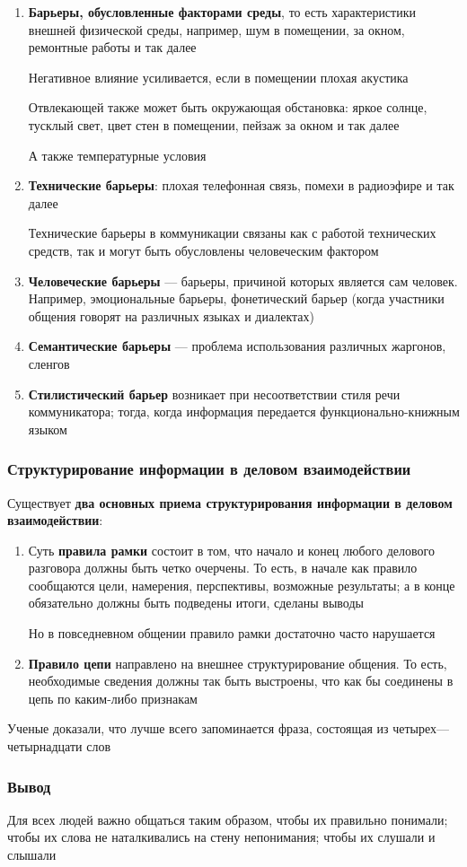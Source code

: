 \documentclass{article}
\begin{document}
\begin{enumerate}
    \item \textbf{Барьеры, обусловленные факторами среды}, то есть характеристики внешней физической среды, например, шум в помещении, за окном, ремонтные работы и так далее

    Негативное влияние усиливается, если в помещении плохая акустика

    Отвлекающей также может быть окружающая обстановка: яркое солнце, тусклый свет, цвет стен в помещении, пейзаж за окном и так далее

    А также температурные условия
    \item \textbf{Технические барьеры}: плохая телефонная связь, помехи в радиоэфире и так далее

    Технические барьеры в коммуникации связаны как с работой технических средств, так и могут быть обусловлены человеческим фактором 
    \item \textbf{Человеческие барьеры} — барьеры, причиной которых является сам человек. Например, эмоциональные барьеры, фонетический барьер (когда участники общения говорят на различных языках и диалектах)
    \item \textbf{Семантические барьеры} — проблема использования различных жаргонов, сленгов
    \item \textbf{Стилистический барьер} возникает при несоответствии стиля речи коммуникатора; тогда, когда информация передается функционально-книжным языком
\end{enumerate}

\subsubsection{Структурирование информации в деловом взаимодействии}

Существует \textbf{два основных приема структурирования информации в деловом взаимодействии}:

\begin{enumerate}
    \item Суть \textbf{правила рамки} состоит в том, что начало и конец любого делового разговора должны быть четко очерчены. То есть, в начале как правило сообщаются цели, намерения, перспективы, возможные результаты; а в конце обязательно должны быть подведены итоги, сделаны выводы

    Но в повседневном общении правило рамки достаточно часто нарушается
    \item \textbf{Правило цепи} направлено на внешнее структурирование общения. То есть, необходимые сведения должны так быть выстроены, что как бы соединены в цепь по каким-либо признакам
\end{enumerate}
    
Ученые доказали, что лучше всего запоминается фраза, состоящая из четырех—четырнадцати слов

\subsubsection{Вывод}

Для всех людей важно общаться таким образом, чтобы их правильно понимали; чтобы их слова не наталкивались на стену непонимания; чтобы их слушали и слышали
\end{document}
